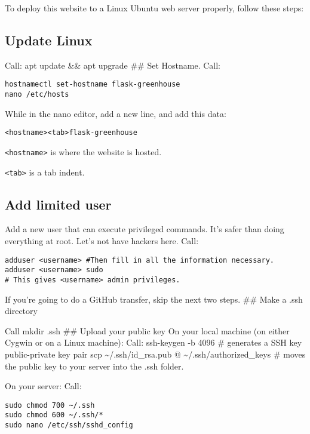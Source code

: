 To deploy this website to a Linux Ubuntu web server properly, follow
these steps:

\subsection{Update Linux}\label{update-linux}

Call: apt update \&\& apt upgrade \#\# Set Hostname. Call:

\begin{verbatim}
hostnamectl set-hostname flask-greenhouse
nano /etc/hosts
\end{verbatim}

While in the nano editor, add a new line, and add this data:

\begin{verbatim}
<hostname><tab>flask-greenhouse
\end{verbatim}

\texttt{\textless{}hostname\textgreater{}} is where the website is
hosted.

\texttt{\textless{}tab\textgreater{}} is a tab indent.

\subsection{Add limited user}\label{add-limited-user}

Add a new user that can execute privileged commands. It's safer than
doing everything at root. Let's not have hackers here. Call:

\begin{verbatim}
adduser <username> #Then fill in all the information necessary.
adduser <username> sudo
# This gives <username> admin privileges.
\end{verbatim}

If you're going to do a GitHub transfer, skip the next two steps. \#\#
Make a .ssh directory

Call mkdir .ssh \#\# Upload your public key On your local machine (on
either Cygwin or on a Linux machine): Call: ssh-keygen -b 4096 \#
generates a SSH key public-private key pair scp
\textasciitilde{}/.ssh/id\_rsa.pub @
\textasciitilde{}/.ssh/authorized\_keys \# moves the public key to your
server into the .ssh folder.

On your server: Call:

\begin{verbatim}
sudo chmod 700 ~/.ssh
sudo chmod 600 ~/.ssh/*
sudo nano /etc/ssh/sshd_config
\end{verbatim}

